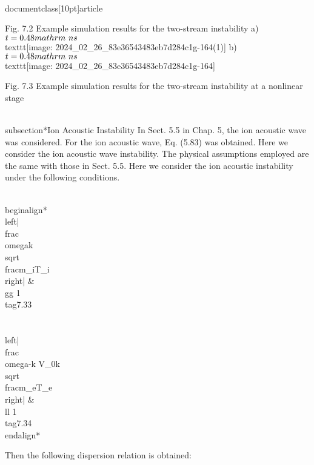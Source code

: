 \\documentclass[10pt]{article}
\begin{document}
{{{{Fig. 7.2 Example simulation results for the two-stream instability
a) $t=0.48 \\mathrm{~ns}$
\\texttt{[image: 2024\_02\_26\_83e36543483eb7d284c1g-164(1)]}
b) $t=0.48 \\mathrm{~ns}$
\\texttt{[image: 2024\_02\_26\_83e36543483eb7d284c1g-164]}

Fig. 7.3 Example simulation results for the two-stream instability at a nonlinear stage

\\subsection*{Ion Acoustic Instability}
In Sect. 5.5 in Chap. 5, the ion acoustic wave was considered. For the ion acoustic wave, Eq. (5.83) was obtained. Here we consider the ion acoustic wave instability. The physical assumptions employed are the same with those in Sect. 5.5. Here we consider the ion acoustic instability under the following conditions.


\\begin{align*}
\\left|\\frac{\\omega}{k} \\sqrt{\\frac{m_{i}}{T_{i}}}\\right| & \\gg 1  \\tag{7.33}\\\\
\\left|\\frac{\\omega-k V_{0}}{k} \\sqrt{\\frac{m_{e}}{T_{e}}}\\right| & \\ll 1 \\tag{7.34}
\\end{align*}


Then the following dispersion relation is obtained:


}}}}
\end{document}
